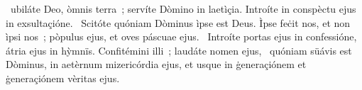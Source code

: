 { }
{%
~ubiláte Deo, òmnis terra~; servíte Dòmino in laetìçia. Introíte in conspèctu ejus in exsultaçióne. 
~Scitóte quóniam Dòminus ìpse est Deus. Ìpse feċit nos, et non ìpsi nos~; pòpulus ejus, et oves páscuae ejus. 
~Introíte portas ejus in confessióne, átria ejus in hỳmnïs. Confitémini illi~; laudáte nomen ejus, 
~quóniam süávis est Dòminus, in aetèrnum mizericórdia ejus, et usque in ġeneraçiónem et ġeneraçiónem vèritas ejus. 
}
